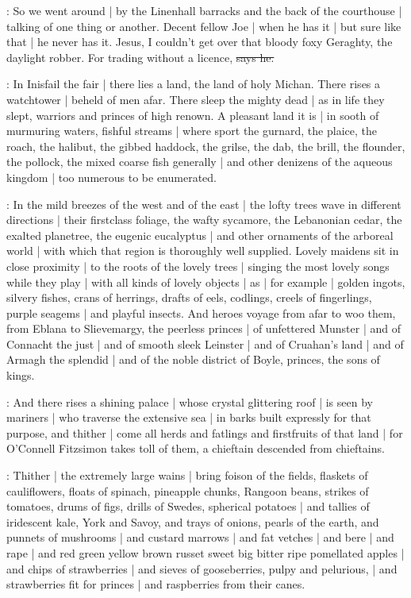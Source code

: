 \Nq:
So we went around |
by the Linenhall barracks and the back of the courthouse |
talking of one thing or another.
Decent fellow Joe |
when he has it |
but sure like that |
he never has it.
Jesus,
I couldn't get over that bloody foxy Geraghty,
the daylight robber.
For trading without a licence,
\sout{says he.}

:
In Inisfail the fair |
there lies a land,
the land of holy Michan.
There rises a watchtower |
beheld of men afar.
There sleep the mighty dead |
as in life they slept,
warriors and princes of high renown.
A pleasant land it is |
in sooth of murmuring waters,
fishful streams |
where sport the gurnard,
the plaice,
the roach,
the halibut,
the gibbed haddock,
the grilse,
the dab,
the brill,
the flounder,
the pollock,
the mixed coarse fish generally |
and other denizens of the aqueous kingdom |
too numerous to be enumerated.

:
In the mild breezes of the west and of the east |
the lofty trees wave in different directions |
their firstclass foliage,
the wafty sycamore,
the Lebanonian cedar,
the exalted planetree,
the eugenic eucalyptus |
and other ornaments of the arboreal world |
with which that region is thoroughly well supplied.
Lovely maidens sit in close proximity |
to the roots of the lovely trees |
singing the most lovely songs
while they play |
with all kinds of lovely objects |
as |
for example |
golden ingots,
silvery fishes,
crans of herrings,
drafts of eels,
codlings,
creels of fingerlings,
purple seagems |
and playful insects.
And heroes voyage from afar to woo them,
from Eblana to Slievemargy,
the peerless princes |
of unfettered Munster |
and of Connacht the just |
and of smooth sleek Leinster |
and of Cruahan's land |
and of Armagh the splendid |
and of the noble district of Boyle,
princes,
the sons of kings.

:
And there rises a shining palace |
whose crystal glittering roof |
is seen by mariners |
who traverse the extensive sea |
in barks built expressly for that purpose,
and thither |
come all herds
and fatlings
and firstfruits
of that land |
for O'Connell Fitzsimon takes toll of them,
a chieftain descended from chieftains.

:
Thither |
the extremely large wains |
bring foison of the fields,
flaskets of cauliflowers,
floats of spinach,
pineapple chunks,
Rangoon beans,
strikes of tomatoes,
drums of figs,
drills of Swedes,
spherical potatoes |
and tallies of iridescent kale,
York and Savoy,
and trays of onions,
pearls of the earth,
and punnets of mushrooms |
and custard marrows |
and fat vetches |
and bere |
and rape |
and red green yellow brown russet sweet big bitter ripe pomellated apples |
and chips of strawberries |
and sieves of gooseberries,
pulpy and pelurious, |
and strawberries fit for princes |
and raspberries from their canes.


